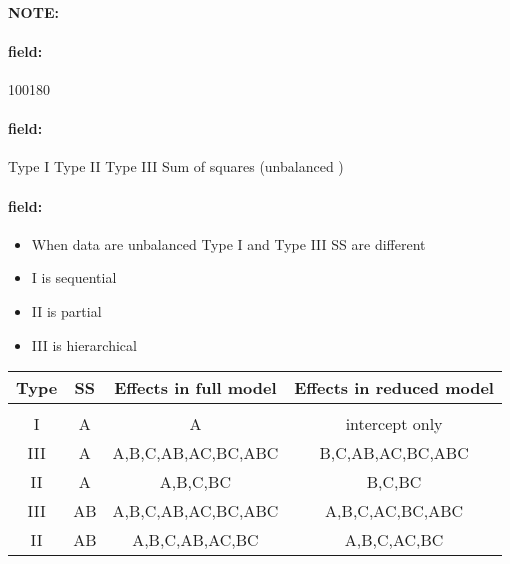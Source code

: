 \documentclass[12pt]{article}
\newenvironment{note}{\paragraph{NOTE:}}{}
\newenvironment{field}{\paragraph{field:}}{}
\begin{document}
\begin{note}
 \begin{field}
  \tiny 100180
 \end{field}
 \begin{field}
  Type I Type II Type III Sum of squares (unbalanced )
 \end{field}
 \begin{field}
  \begin{itemize}
   \item When data are unbalanced Type I and Type III SS are different
   \item I is sequential
   \item II is partial
   \item III is hierarchical
  \end{itemize}

  \begin{center}
   \begin{tabular}{|c|c|c|c|}
    Type & SS & Effects in full model & Effects in reduced model \\
    \hline                                                       \\
    I    & A  & A                     & intercept only           \\
    III  & A  & A,B,C,AB,AC,BC,ABC    & B,C,AB,AC,BC,ABC         \\
    II   & A  & A,B,C,BC              & B,C,BC                   \\
    III  & AB & A,B,C,AB,AC,BC,ABC    & A,B,C,AC,BC,ABC          \\
    II   & AB & A,B,C,AB,AC,BC        & A,B,C,AC,BC
   \end{tabular}
  \end{center}
 \end{field}
\end{note}

\end{document}
